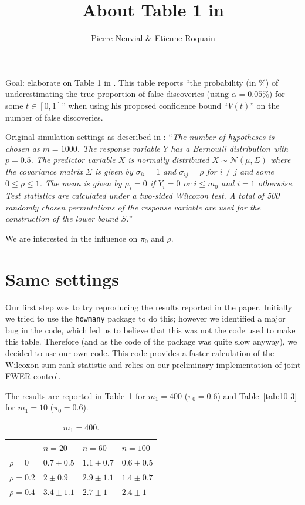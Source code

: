 \documentclass{article}
\title{About Table 1 in \citet{meinshausen06false}}
\author{Pierre Neuvial \& Etienne Roquain}
\begin{document}
\maketitle

Goal: elaborate on Table 1 in \cite{meinshausen06false}.  This table reports ``the  probability (in \%) of underestimating the true proportion of false discoveries (using $\alpha=0.05\%$) for some $t\in[0,1]$'' when using his proposed confidence bound ``$V(t)$'' on the number of false discoveries.

Original simulation settings as described in \cite{meinshausen06false}:
``\emph{The number of hypotheses is chosen as $m=1000$. The response variable $Y$ has a Bernoulli distribution with $p=0.5$. The predictor variable $X$ is normally distributed $X \sim \mathcal{N}(\mu,\Sigma)$ where the covariance matrix $\Sigma$ is given by $\sigma_{ii}=1$ and $\sigma_{ij}=\rho$ for $i\neq j$ and some $0\leq \rho \leq 1$. The mean is given by $\mu_i=0$ if $Y_i =0$ or $i \leq m_0$ and $i = 1$ otherwise. Test statistics are calculated under a two-sided Wilcoxon test. A total of 500 randomly chosen permutations of the response variable are used for the construction of the lower bound $S$.}''

We are interested in the influence on $\pi_0$ and $\rho$.

\section{Same settings}
Our first step was to try reproducing the results reported in the paper.  Initially we tried to use the \texttt{howmany} package to do this;  however we identified a major bug in the code, which led us to believe that this was not the code used to make this table.  Therefore (and as the code of the package was quite slow anyway), we decided to use our own code.  This code provides a faster calculation of the Wilcoxon sum rank statistic and relies on our preliminary implementation of joint FWER control. 


The results are reported in Table~\ref{tab:400-3} for $m_1=400$ ($\pi_0=0.6$) and Table~\ref{tab:10-3} for $m_1=10$ ($\pi_0=0.6$).
\begin{table}[ht]
\centering
\begin{tabular}{llll}
  \hline
 & $n=20$ & $n=60$ & $n=100$ \\ 
  \hline
$\rho=0$ & $0.7\pm0.5$ & $1.1\pm0.7$ & $0.6\pm0.5$ \\ 
  $\rho=0.2$ & $2\pm0.9$ & $2.9\pm1.1$ & $1.4\pm0.7$ \\ 
  $\rho=0.4$ & $3.4\pm1.1$ & $2.7\pm1$ & $2.4\pm1$ \\ 
   \hline
\end{tabular}
\caption{$m_1=400$.} 
\label{tab:400-3}
\end{table}
\end{document}
